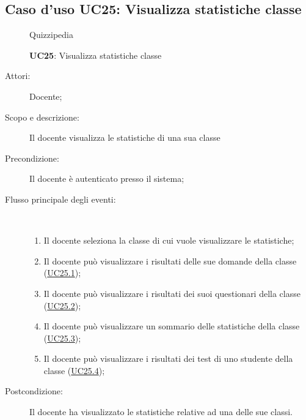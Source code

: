 \subsection{Caso d'uso UC25: Visualizza statistiche classe}
	\begin{figure}[H]
		\centering
		\begin{resizedtikzpicture}{\textwidth}
		\begin{umlsystem}[x=0, fill=lightgray!20]{Quizzipedia}
		\end{umlsystem}
		\end{resizedtikzpicture}
		\caption{\textbf{UC25}: Visualizza statistiche classe}
		\label{UC25}
	\end{figure}
\begin{description}
\item[Attori:] Docente;
\item[Scopo e descrizione:] Il docente visualizza le statistiche di una sua classe
      \item[Precondizione:] Il docente è autenticato presso il sistema;

        \item[Flusso principale degli eventi:] \ 
 \begin{enumerate}
          \item Il docente seleziona la classe di cui vuole visualizzare le statistiche;
          \item Il docente può visualizzare i risultati delle sue domande della classe (\hyperlink{UC25.1}{UC25.1});
          \item Il docente può visualizzare i risultati dei suoi questionari della classe (\hyperlink{UC25.2}{UC25.2});
          \item Il docente può visualizzare un sommario delle statistiche della classe (\hyperlink{UC25.3}{UC25.3});
          \item Il docente può visualizzare i risultati dei test di uno studente della classe (\hyperlink{UC25.4}{UC25.4});

      \end{enumerate}
    \item[Postcondizione:] Il docente ha visualizzato le statistiche relative ad una delle sue classi.
  \end{description}
\hypertarget{UC25.1}{}
